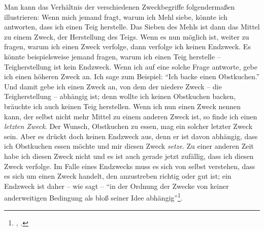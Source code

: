 Man kann das Verhältnis der verschiedenen Zweckbegriffe folgendermaßen
illustrieren: Wenn mich jemand fragt, warum ich Mehl siebe, könnte ich
antworten, dass ich einen Teig herstelle. Das Sieben des Mehls ist dann das
Mittel zu einem Zweck, der Herstellung des Teigs. Wenn es nun möglich ist,
weiter zu fragen, warum ich einen Zweck verfolge, dann verfolge ich keinen
Endzweck. Es könnte beispielsweise jemand fragen, warum ich einen Teig herstelle
-- Teigherstellung ist kein Endzweck. Wenn ich auf eine solche Frage antworte,
gebe ich einen höheren Zweck an. Ich sage zum Beispiel: \enquote{Ich backe einen
Obstkuchen.} Und damit gebe ich einen Zweck an, von dem der niedere
Zweck -- die Teigherstellung -- abhängig ist; denn wollte ich keinen Obstkuchen
backen, bräuchte ich auch keinen Teig herstellen. Wenn ich nun einen Zweck
nennen kann, der selbst nicht mehr Mittel zu einem anderen Zweck ist,
so finde ich einen \emph{letzten Zweck}. Der Wunsch, Obstkuchen zu essen, mag
ein solcher letzter Zweck sein. Aber es drückt doch keinen Endzweck aus, denn er
ist davon abhängig, dass ich Obstkuchen essen möchte und mir diesen Zweck
\emph{setze}. Zu einer anderen Zeit habe ich diesen Zweck nicht und es ist auch
gerade jetzt zufällig, dass ich diesen Zweck verfolge. Im Falle eines Endzwecks
muss es sich von selbst verstehen, dass es sich um einen Zweck handelt, den
anzustreben richtig oder gut ist; ein Endzweck ist daher -- wie
 sagt -- \enquote{in der Ordnung der Zwecke von keiner
anderweitigen Bedingung als bloß seiner Idee
abhängig}\footnote{\cite[\S~84]{Kant:KritikderUrteilskraft2009}, \cite[V:
435.13--14]{Kant:GesammelteWerke1900ff.}.}.


